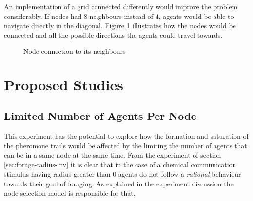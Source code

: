 An implementation of a grid connected differently would improve the problem considerably. If nodes had $8$ neighbours instead of $4$, agents would be able to navigate directly in the diagonal. Figure \ref{fig:connection} illustrates how the nodes would be connected and all the possible directions the agents could travel towards.

\begin{figure}[H]
\myfloatalign
{} \quad
{}

\caption{Node connection to its neighbours}
\label{fig:connection}
\end{figure}

\section{Proposed Studies}
\label{sec:new-studies}

\subsection{Limited Number of Agents Per Node}

This experiment has the potential to explore how the formation and saturation of the pheromone trails would be affected by the limiting the number of agents that can be in a same node at the same time. From the experiment of section \ref{sec:forage-radius-inv} it is clear that in the case of a chemical communication stimulus having radius greater than $0$ agents do not follow a \emph{rational} behaviour towards their goal of foraging. As explained in the experiment discussion the node selection model is responsible for that.

